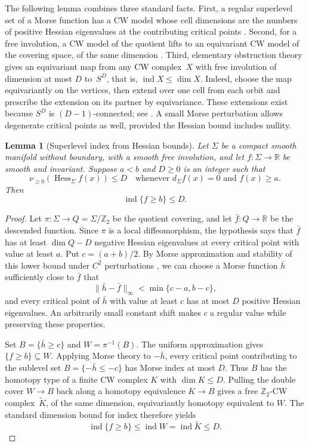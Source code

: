 \documentclass[11pt]{article}
\newtheorem{lemma}[theorem]{Lemma}
\theoremstyle{remark}
\DeclareMathOperator{\ind}{ind}
\DeclareMathOperator{\Hess}{Hess}
\newcommand{\R}{\mathbb R}
\newcommand{\nuplus}{\nu_{\geq 0}}
\begin{document}
The following lemma combines three standard facts. First, a regular
superlevel set of a Morse function has a CW model whose cell dimensions
are the numbers of positive Hessian eigenvalues at the contributing
critical points
\cite[Theorem~3.5 and the subsequent remark]{Milnor}.
Second, for a free involution, a CW model of the quotient lifts to an
equivariant CW model of the covering space, of the same dimension
\cite[Proposition~1.30 and Appendix, Exercise~1]{Hatcher}.
Third, elementary obstruction theory gives an equivariant map from
any CW complex~$X$ with free involution of dimension at most $D$ to~$S^D$, that is, $\ind X\le \dim X$. Indeed,
choose the map equivariantly on the vertices, then extend over one
cell from each orbit and prescribe the extension on its partner by
equivariance. These extensions exist because $S^D$ is
$(D-1)$-connected; see \cite[Lemma~4.7]{Hatcher}.
A small Morse perturbation allows degenerate critical points as well,
provided the Hessian bound includes nullity.

\begin{lemma}[Superlevel index from Hessian bounds]\label{lem:morse}
Let $\Sigma$ be a compact smooth manifold without boundary, with a
smooth free involution, and let $f\colon\Sigma\to\R$ be smooth and invariant.
Suppose $a<b$ and $D\geq0$ is an integer such that
\[
 \nuplus(\Hess_\Sigma f(x))\leq D
 \quad\text{whenever }d_\Sigma f(x)=0\text{ and }f(x)\geq a.
\]
Then
\[
 \ind\{f\geq b\}\leq D.
\]
\end{lemma}

\begin{proof}
Let $\pi\colon\Sigma\to Q=\Sigma/\mathbb Z_2$ be the quotient covering,
and let $\bar f\colon Q\to\R$ be the descended function.
Since $\pi$ is a local diffeomorphism, the hypothesis says that
$\bar f$ has at least $\dim Q-D$ negative Hessian eigenvalues
at every critical point with value at least $a$.
Put $c=(a+b)/2$.
By Morse approximation and stability of this lower bound under
$C^2$ perturbations
\cite[Corollary~6.8 and Lemma~22.4]{Milnor},
we can choose a Morse function $\bar h$ sufficiently close to $\bar f$
that
\[
 \|\bar h-\bar f\|_\infty<\min\{c-a,b-c\},
\]
and every critical point of $\bar h$ with value at least $c$ has
at most $D$ positive Hessian eigenvalues.
An arbitrarily small constant shift makes $c$ a regular value
while preserving these properties.

Set $B=\{\bar h\geq c\}$ and $W=\pi^{-1}(B)$.
The uniform approximation gives $\{f\geq b\}\subseteq W$.
Applying Morse theory to $-\bar h$, every critical point contributing
to the sublevel set $B=\{-\bar h\leq-c\}$ has Morse index at most $D$.
Thus $B$ has the homotopy type of a finite CW complex $K$ with
$\dim K\leq D$.
Pulling the double cover $W\to B$ back along a homotopy equivalence
$K\to B$ gives a free $\mathbb Z_2$-CW complex~$\widetilde K$,
of the same dimension, equivariantly homotopy equivalent to $W$.
The standard dimension bound for index therefore yields
\[
 \ind\{f\geq b\}
 \leq \ind W
 = \ind\widetilde K
 \leq D.
\]
\end{proof}
\end{document}

